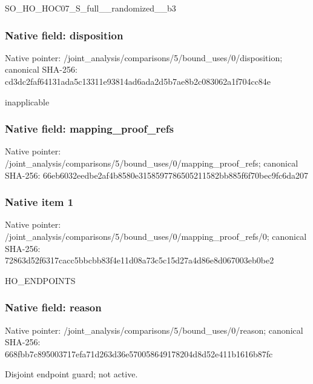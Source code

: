 \documentclass[10pt,a4paper]{article}
\begin{document}
\begingroup\raggedright\sloppy SO\_\allowbreak{}HO\_\allowbreak{}HOC07\_\allowbreak{}S\_\allowbreak{}full\_\allowbreak{}\_\allowbreak{}randomized\_\allowbreak{}\_\allowbreak{}b3\par\endgroup

\subsubsection{Native field: disposition}
Native pointer: /joint\_\allowbreak{}analysis/comparisons/5/bound\_\allowbreak{}uses/0/disposition; canonical SHA-256: cd3dc2faf64131ada5c13311e93814ad6ada2d5b7ae8b2c083062a1f704cc84e

\begingroup\raggedright\sloppy inapplicable\par\endgroup

\subsubsection{Native field: mapping\_\allowbreak{}proof\_\allowbreak{}refs}
Native pointer: /joint\_\allowbreak{}analysis/comparisons/5/bound\_\allowbreak{}uses/0/mapping\_\allowbreak{}proof\_\allowbreak{}refs; canonical SHA-256: 66eb6032eedbe2af4b8580e3158597786505211582bb885f6f70bec9fc6da207

\subsubsection{Native item 1}
Native pointer: /joint\_\allowbreak{}analysis/comparisons/5/bound\_\allowbreak{}uses/0/mapping\_\allowbreak{}proof\_\allowbreak{}refs/0; canonical SHA-256: 72863d52f6317cacc5bbcbb83f4e11d08a73c5c15d27a4d86e8d067003eb0be2

\begingroup\raggedright\sloppy HO\_\allowbreak{}ENDPOINTS\par\endgroup

\subsubsection{Native field: reason}
Native pointer: /joint\_\allowbreak{}analysis/comparisons/5/bound\_\allowbreak{}uses/0/reason; canonical SHA-256: 668fbb7c895003717efa71d263d36e570058649178204d8d52e411b1616b87fc

\begingroup\raggedright\sloppy Disjoint endpoint guard;\allowbreak{} not active.\par\endgroup
\end{document}
